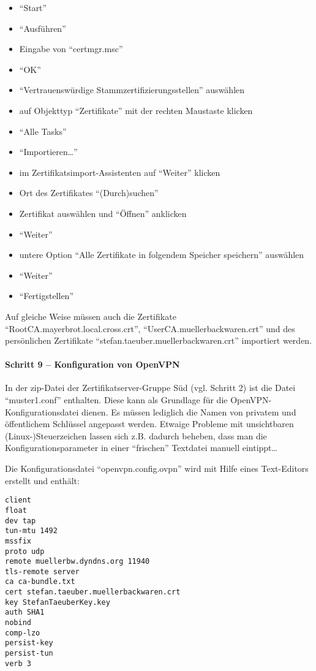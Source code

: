 \begin{itemize}
  \item ``Start''
  \item ``Ausführen''
  \item Eingabe von ``certmgr.msc''
  \item ``OK''
  \item ``Vertrauenswürdige Stammzertifizierungsstellen'' auswählen
  \item auf Objekttyp ``Zertifikate'' mit der rechten Maustaste klicken
  \item ``Alle Tasks''
  \item ``Importieren\ldots''
  \item im Zertifikatsimport-Assistenten auf ``Weiter'' klicken
  \item Ort des Zertifikates ``(Durch)suchen''
  \item Zertifikat auswählen und ``Öffnen'' anklicken
  \item ``Weiter''
  \item untere Option ``Alle Zertifikate in folgendem Speicher speichern'' auswählen
  \item ``Weiter''
  \item ``Fertigstellen''
\end{itemize}

Auf gleiche Weise müssen auch die Zertifikate
``RootCA.mayerbrot.local.cross.crt'', ``UserCA.muellerbackwaren.crt'' und des
persönlichen Zertifikate ``stefan.taeuber.muellerbackwaren.crt'' importiert
werden.

\paragraph{Schritt 9 -- Konfiguration von OpenVPN}

In der zip-Datei der Zertifikatserver-Gruppe Süd (vgl. Schritt 2) ist die Datei
``muster1.conf'' enthalten. Diese kann als Grundlage für die
OpenVPN-Konfigurationsdatei dienen. Es müssen lediglich die Namen von privatem
und öffentlichem Schlüssel angepasst werden. Etwaige Probleme mit unsichtbaren
(Linux-)Steuerzeichen lassen sich z.B. dadurch beheben, dass man die
Konfigurationsparameter in einer ``frischen'' Textdatei manuell eintippt\ldots

Die Konfigurationsdatei ``openvpn.config.ovpn'' wird mit Hilfe eines
Text-Editors erstellt und enthält:

\begin{lstlisting}
client
float
dev tap
tun-mtu 1492
mssfix
proto udp
remote muellerbw.dyndns.org 11940
tls-remote server
ca ca-bundle.txt
cert stefan.taeuber.muellerbackwaren.crt
key StefanTaeuberKey.key
auth SHA1
nobind
comp-lzo
persist-key
persist-tun
verb 3
\end{lstlisting}

